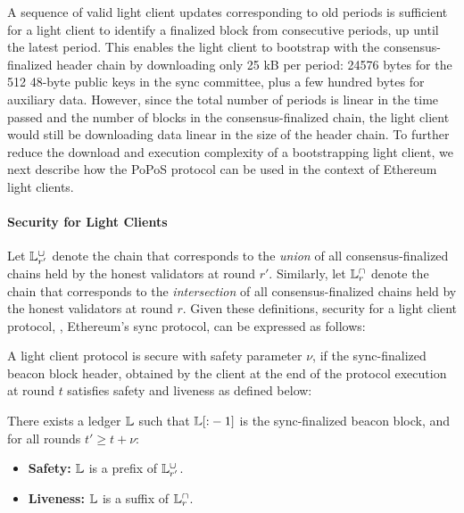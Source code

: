 A sequence of valid light client updates corresponding to old periods is sufficient for a light client 
to identify a finalized block from consecutive periods, up until the latest period.
This enables the light client to bootstrap with the consensus-finalized header chain by downloading only
25 kB per period: 24576 bytes for the 512 48-byte public keys in the sync committee, plus a few hundred bytes for auxiliary data.
However, since the total number of periods is linear in the time passed and the number of blocks in the consensus-finalized chain,
the light client would still be downloading data linear in the size of the header chain.  
To further reduce the download and execution complexity of a bootstrapping light client, we next describe how the
PoPoS protocol can be used in the context of Ethereum light clients.

\paragraph{Security for Light Clients}

Let $\mathbb{L}^{\cup}_{r'}$ denote the chain that corresponds to the \emph{union} of all consensus-finalized chains held by the honest validators at round $r'$.
Similarly, let $\mathbb{L}^{\cap}_{r}$ denote the chain that corresponds to the \emph{intersection} of all consensus-finalized chains held by the honest validators at round $r$.
Given these definitions, security for a light client protocol, \eg, Ethereum's sync protocol, can be expressed as follows:
\begin{definition}
\label{def:light-client-security} 
A light client protocol is secure with safety parameter $\nu$, if the sync-finalized beacon block header,
obtained by the client at the end of the protocol execution at round $t$ satisfies safety and liveness as defined below:

There exists a ledger $\mathbb{L}$ such that $\mathbb{L}[{:}-1]$ is the sync-finalized beacon block, and for all rounds $t' \geq t + \nu$:
\begin{itemize}
    \item \textbf{Safety:} $\mathbb{L}$ is a prefix of $\mathbb{L}^{\cup}_{r'}$.
    \item \textbf{Liveness:} $\mathbb{L}$ is a suffix of $\mathbb{L}^{\cap}_{r}$.
\end{itemize}

\end{definition}

  
   